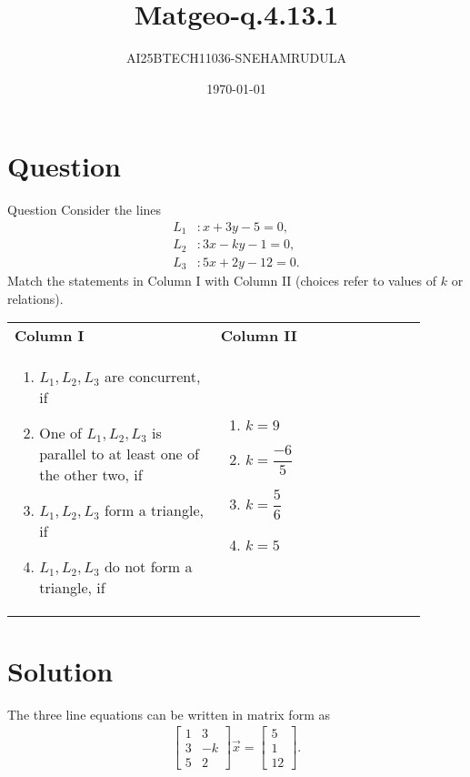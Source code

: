 \documentclass{beamer}
\title{Matgeo-q.4.13.1}
\author{AI25BTECH11036-SNEHAMRUDULA}
\date{\today}
\newcommand{\myvec}[1]{\begin{bmatrix}#1\end{bmatrix}}
\begin{document}
\begin{frame}
  \titlepage
\end{frame}

\section{Question}
\begin{frame}{Question}
Consider the lines
\[
\begin{aligned}
L_1 &: x + 3y - 5 = 0, \\
L_2 &: 3x - ky - 1 = 0, \\
L_3 &: 5x + 2y - 12 = 0.
\end{aligned}
\]
Match the statements in Column I with Column II (choices refer to values of \(k\) or relations).
\begin{center}
\begin{tabular}{p{0.45\linewidth} p{0.45\linewidth}}
\textbf{Column I} & \textbf{Column II} \\
\begin{enumerate}[label=(\Alph*)]
    \item $L_1, L_2, L_3$ are concurrent, if
    \item One of $L_1, L_2, L_3$ is parallel to at least one of the other two, if
    \item $L_1, L_2, L_3$ form a triangle, if
    \item $L_1, L_2, L_3$ do not form a triangle, if
\end{enumerate}
&
\begin{enumerate}[label=(\alph*)]
    \item $k = 9$
    \item $k = \dfrac{-6}{5}$
    \item $k = \dfrac{5}{6}$
    \item $k = 5$
\end{enumerate}
\end{tabular}
\end{center}
\end{frame}

\section{Solution}
The three line equations can be written in matrix form as
\begin{align}
    \myvec{
    1 & 3 \\
    3 & -k \\
    5 & 2
    }\vec{x}
    =
    \myvec{5\\1\\12}.                                   \label{eq:mainmatrix}
\end{align}
\end{document}
